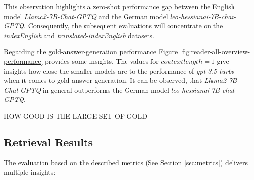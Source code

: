 This observation highlights a zero-shot performance gap between the English model \textit{Llama2-7B-Chat-GPTQ} and the German model \textit{leo-hessianai-7B-chat-GPTQ}. Consequently, the subsequent evaluations will concentrate on the \textit{indexEnglish} and \textit{translated-indexEnglish} datasets.

Regarding the gold-answer-generation performance Figure \ref{fig:reader-all-overview-performance} provides some insights. The values for $context length = 1$ give insights how close the smaller models are to the performance of \textit{gpt-3.5-turbo} when it comes to gold-answer-generation. It can be observed, that \textit{Llama2-7B-Chat-GPTQ} in general outperforms the German model \textit{leo-hessianai-7B-chat-GPTQ}. 

HOW GOOD IS THE LARGE SET OF GOLD 


\subsection{Retrieval Results}
\label{subsec:retrieval-results}

The evaluation based on the described metrics (See Section \ref{sec:metrics}) delivers multiple insights:


